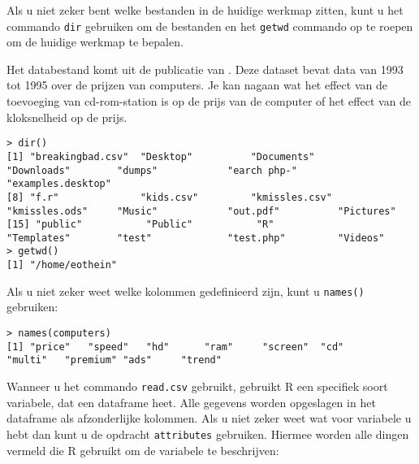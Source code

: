 Als u niet zeker bent welke bestanden in de huidige werkmap zitten, kunt u het commando \texttt{dir}  gebruiken om de bestanden en het  \texttt{getwd} commando op te roepen om de huidige werkmap te bepalen.

Het databestand komt uit de publicatie van \autocite{Stengos2005}. Deze dataset bevat data van 1993 tot 1995 over de prijzen van computers. Je kan nagaan wat het effect van de toevoeging van cd-rom-station is op de prijs van de computer of  het effect van de kloksnelheid op de prijs. 

\begin{lstlisting}
> dir()
[1] "breakingbad.csv"  "Desktop"          "Documents"        "Downloads"        "dumps"            "earch php-"       "examples.desktop"
[8] "f.r"              "kids.csv"         "kmissles.csv"     "kmissles.ods"     "Music"            "out.pdf"          "Pictures"        
[15] "public"           "Public"           "R"                "Templates"        "test"             "test.php"         "Videos"          
> getwd()
[1] "/home/eothein"
\end{lstlisting}
Als u niet zeker weet welke kolommen gedefinieerd zijn, kunt u  \texttt{names()} gebruiken:


\begin{lstlisting}
> names(computers)
[1] "price"   "speed"   "hd"      "ram"     "screen"  "cd"      "multi"   "premium" "ads"     "trend"
\end{lstlisting}

 Wanneer u het commando \texttt{read.csv} gebruikt, gebruikt R een specifiek soort variabele, dat een dataframe heet. Alle gegevens worden opgeslagen in het dataframe als afzonderlijke kolommen. Als u niet zeker weet wat voor variabele u hebt dan kunt u de opdracht \texttt{attributes} gebruiken. Hiermee worden alle dingen vermeld die R gebruikt om de variabele te beschrijven:

